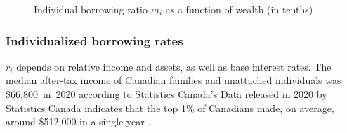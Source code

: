 
\begin{figure}[htb]
\caption{Individual borrowing ratio $m_i$ as a function of wealth (in tenths)}
 \label{Fig:Borrowingratio}
\end{figure}


\subsubsection{Individualized borrowing rates}\label{SS:BorowingRate}
 
 
 $r_i$ depends on relative income and assets, as well as base interest rates. %
 The median after-tax income of Canadian families and unattached individuals was \$66,800 in 2020 according to Statistics Canada's %
 Data released in 2020 by Statistics Canada indicates that the top 1\% of Canadians made, on average, around \$512,000 in a single year \cite{stats-can-canadian-incomes}. %

